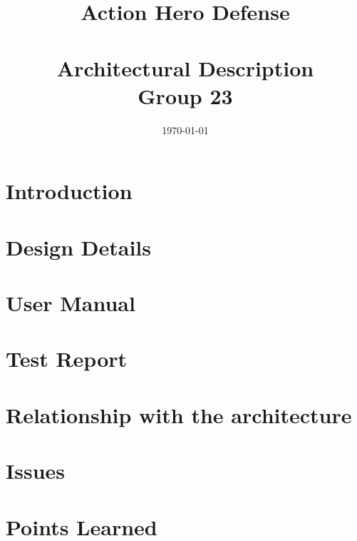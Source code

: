 \documentclass[a4paper, 11pt]{article}
\title{\textbf{Action Hero Defense}\\\HRule\\Architectural Description\\ Group 23}
\author{\and Håvard Geithus
	\and  Sondre Løberg Sæter 
	\and Nicolai Meltveit 
	\and Hallvard Andreas Eriksen 
	\and  Håkon Drolsum Røkenes}
\date{\today}
\begin{document}


\renewcommand\thepage{}
\tableofcontents
\clearpage
\listoffigures
\clearpage

\renewcommand\thepage{\arabic{page}}
\setcounter{page}{1}
\section{Introduction}


\section{Design Details}


\section{User Manual}


\section{Test Report}


\section{Relationship with the architecture}


\section{Issues}


\section{Points Learned}


\appendix




\end{document}
